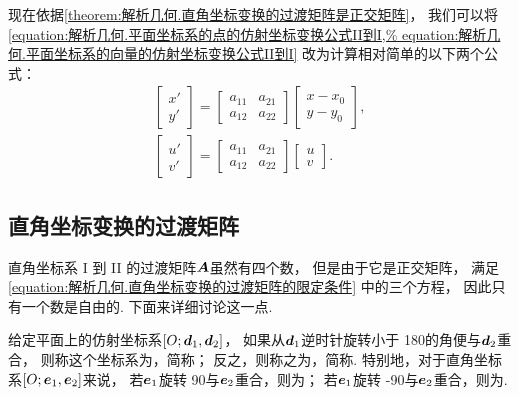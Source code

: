 现在依据\cref{theorem:解析几何.直角坐标变换的过渡矩阵是正交矩阵}，
我们可以将\cref{equation:解析几何.平面坐标系的点的仿射坐标变换公式II到I,%
equation:解析几何.平面坐标系的向量的仿射坐标变换公式II到I} 改为计算相对简单的以下两个公式：
\begin{gather}
	\begin{bmatrix}
		x' \\ y'
	\end{bmatrix}
	= \begin{bmatrix}
		a_{11} & a_{21} \\
		a_{12} & a_{22}
	\end{bmatrix}
	\begin{bmatrix}
		x - x_0 \\ y - y_0
	\end{bmatrix},
	\label{equation:解析几何.平面坐标系的点的直角坐标变换公式II到I.矩阵形式1} \\
	\begin{bmatrix}
		u' \\ v'
	\end{bmatrix}
	= \begin{bmatrix}
		a_{11} & a_{21} \\
		a_{12} & a_{22}
	\end{bmatrix}
	\begin{bmatrix}
		u \\ v
	\end{bmatrix}.
	\label{equation:解析几何.平面坐标系的向量的直角坐标变换公式II到I.矩阵形式1}
\end{gather}

\subsection{直角坐标变换的过渡矩阵}
直角坐标系 I 到 II 的过渡矩阵\(\boldsymbol{A}\)虽然有四个数，
但是由于它是正交矩阵，
满足\cref{equation:解析几何.直角坐标变换的过渡矩阵的限定条件} 中的三个方程，
因此只有一个数是自由的.
下面来详细讨论这一点.

给定平面上的仿射坐标系\([O;\boldsymbol{d}_1,\boldsymbol{d}_2]\)，
如果从\(\boldsymbol{d}_1\)逆时针旋转小于 180\textdegree 的角便与\(\boldsymbol{d}_2\)重合，
则称这个坐标系为，简称；
反之，则称之为，简称.
特别地，对于直角坐标系\([O;\boldsymbol{e}_1,\boldsymbol{e}_2]\)来说，
若\(\boldsymbol{e}_1\)旋转 90\textdegree 与\(\boldsymbol{e}_2\)重合，则为；
若\(\boldsymbol{e}_1\)旋转 -90\textdegree 与\(\boldsymbol{e}_2\)重合，则为.

